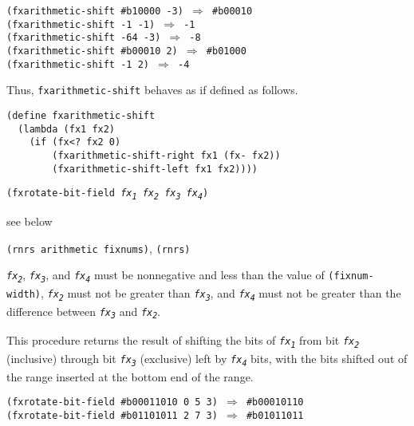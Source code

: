 \begin{alltt}
(fxarithmetic-shift \#{}b10000 -3) \(\Rightarrow\) \#{}b00010
(fxarithmetic-shift -1 -1) \(\Rightarrow\) -1
(fxarithmetic-shift -64 -3) \(\Rightarrow\) -8
(fxarithmetic-shift \#{}b00010 2) \(\Rightarrow\) \#{}b01000
(fxarithmetic-shift -1 2) \(\Rightarrow\) -4
\end{alltt}


Thus, \texttt{fxarithmetic-shift} behaves as if defined as follows.


\begin{alltt}
(define fxarithmetic-shift
  (lambda (fx1 fx2)
    (if (fx\textless{}? fx2 0)
        (fxarithmetic-shift-right fx1 (fx- fx2))
        (fxarithmetic-shift-left fx1 fx2))))
\end{alltt}

\begin{description}

\label{objects_s174}\item[procedure] \texttt{(fxrotate-bit-field \textit{fx\textsubscript{1}} \textit{fx\textsubscript{2}} \textit{fx\textsubscript{3}} \textit{fx\textsubscript{4}})}



\item[returns] see below


\item[libraries] \texttt{(rnrs arithmetic fixnums)}, \texttt{(rnrs)}
\end{description}

\texttt{\textit{fx\textsubscript{2}}}, \texttt{\textit{fx\textsubscript{3}}}, and \texttt{\textit{fx\textsubscript{4}}} must be nonnegative and less than
the value of \texttt{(fixnum-width)}, \texttt{\textit{fx\textsubscript{2}}} must not be greater
than \texttt{\textit{fx\textsubscript{3}}}, and \texttt{\textit{fx\textsubscript{4}}} must not be greater than the difference between
\texttt{\textit{fx\textsubscript{3}}} and \texttt{\textit{fx\textsubscript{2}}}.

This procedure returns the result of shifting the bits of
\texttt{\textit{fx\textsubscript{1}}} from bit \texttt{\textit{fx\textsubscript{2}}} (inclusive) through bit \texttt{\textit{fx\textsubscript{3}}} (exclusive)
left by \texttt{\textit{fx\textsubscript{4}}} bits, with the bits shifted out of the range inserted
at the bottom end of the range.


\begin{alltt}
(fxrotate-bit-field \#{}b00011010 0 5 3) \(\Rightarrow\) \#{}b00010110
(fxrotate-bit-field \#{}b01101011 2 7 3) \(\Rightarrow\) \#{}b01011011
\end{alltt}

